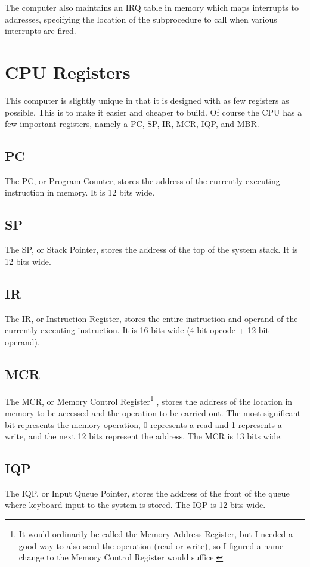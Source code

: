 \documentclass{book}
\begin{document}
The computer also maintains an IRQ table in memory which maps interrupts to addresses, specifying
the location of the subprocedure to call when various interrupts are fired.

\section{CPU Registers}
This computer is slightly unique in that it is designed with as few registers as
possible. This is to make it easier and cheaper to build. Of course the CPU has a few
important registers, namely a PC, SP, IR, MCR, IQP, and MBR.
\subsection{PC}
  The PC, or Program Counter, stores the address of the currently executing instruction
  in memory. It is 12 bits wide.

\subsection{SP}
  The SP, or Stack Pointer, stores the address of the top of the system stack. It is
  12 bits wide.

\subsection{IR}
  The IR, or Instruction Register, stores the entire instruction and operand of the currently
  executing instruction. It is 16 bits wide (4 bit opcode + 12 bit operand).

\subsection{MCR}
The MCR, or Memory Control Register\footnote{It would ordinarily be called the Memory Address
  Register, but I needed a good way to also send the operation (read or write), so I figured a
name change to the Memory Control Register would suffice.}
  , stores the address of the location in memory to be
  accessed and the operation to be carried out. The most significant bit represents the
  memory operation, 0 represents a read and 1 represents a write, and the next 12 bits
  represent the address. The MCR is 13 bits wide.

\subsection{IQP}
  The IQP, or Input Queue Pointer, stores the address of the front of the queue where keyboard
  input to the system is stored. The IQP is 12 bits wide.
\end{document}
